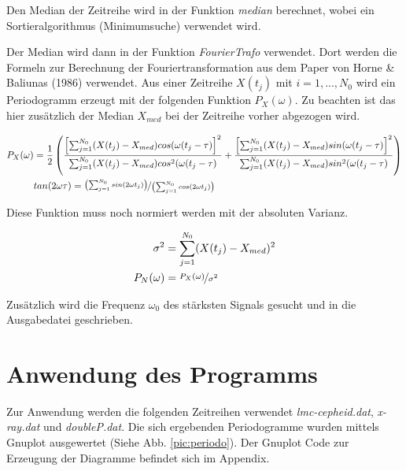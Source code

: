 \documentclass{scrartcl}
\begin{document}


Den Median der Zeitreihe wird in der Funktion \textit{median} berechnet, wobei ein Sortieralgorithmus (Minimumsuche) verwendet wird. 



Der Median wird dann in der Funktion \textit{FourierTrafo} verwendet. Dort werden die Formeln zur Berechnung der Fouriertransformation aus dem Paper von Horne \& Baliunas (1986) verwendet. Aus einer Zeitreihe $ X(t_j) $ mit $ i = 1, ... , N_0 $ wird ein Periodogramm erzeugt mit der folgenden Funktion $ P_X(\omega) $. Zu beachten ist das hier zusätzlich der Median $ X_{med} $ bei der Zeitreihe vorher abgezogen wird.

\begin{align*}
	P_X (\omega) & = \frac{1}{2}\left( \frac{\left[ \sum_{j=1}^{N_0}(X(t_j) - X_{med})cos(\omega (t_j - \tau) \right]^2 }{\sum_{j=1}^{N_0}(X(t_j) - X_{med})cos^2(\omega (t_j - \tau)} + \frac{\left[ \sum_{j=1}^{N_0}(X(t_j) - X_{med})sin(\omega (t_j - \tau) \right]^2 }{\sum_{j=1}^{N_0}(X(t_j) - X_{med})sin^2(\omega (t_j - \tau)} \right) \\
	& tan(2\omega \tau)  =\nicefrac{\left(\sum_{j=1}^{N_0}sin(2\omega t_j ) \right)}{\left(\sum_{j=1}^{N_0}cos(2\omega t_j ) \right)} 
\end{align*}

Diese Funktion muss noch normiert werden mit der absoluten Varianz.

\begin{align*}
	\sigma^2 & = \sum_{j=1}^{N_0}(X(t_j)- X_{med})^2 \\
 	P_N(\omega ) & = \nicefrac{P_X(\omega ) }{\sigma ^2} 
\end{align*}



Zusätzlich wird die Frequenz $ \omega _0 $ des stärksten Signals gesucht und in die Ausgabedatei geschrieben.



\section{Anwendung des Programms}

Zur Anwendung werden die folgenden Zeitreihen verwendet \textit{lmc-cepheid.dat}, \textit{x-ray.dat} und \textit{doubleP.dat}. Die sich ergebenden Periodogramme wurden mittels Gnuplot ausgewertet (Siehe Abb. \ref{pic:periodo}). Der Gnuplot Code zur Erzeugung der Diagramme befindet sich im Appendix.
\end{document}
